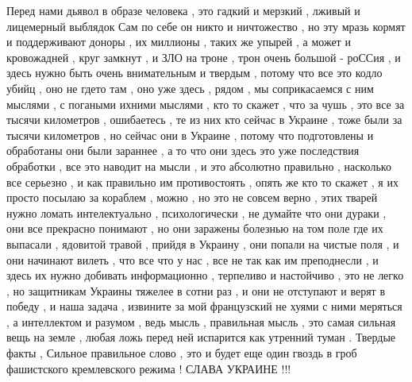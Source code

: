 Перед нами дьявол в образе человека , это гадкий и мерзкий , лживый и
лицемерный выблядок Сам по себе он никто и ничтожество , но эту мразь кормят и
поддерживают доноры , их миллионы , таких же упырей , а может и кровожадней ,
круг замкнут , и ЗЛО на троне , трон очень большой - роССия , и здесь нужно
быть очень внимательным и твердым , потому что все это кодло убийц , оно не
гдето там , оно уже здесь , рядом , мы соприкасаемся с ним мыслями , с погаными
ихними мыслями , кто то скажет , что за чушь , это все за тысячи километров ,
ошибаетесь , те из них кто сейчас в Украине , тоже были за тысячи километров ,
но сейчас они в Украине , потому что подготовлены и обработаны они были
зараннее , а то что они здесь это уже последствия обработки , все это наводит
на мысли , и это абсолютно правильно , насколько все серьезно , и как правильно
им противостоять , опять же кто то скажет , я их просто посылаю за кораблем ,
можно , но это не совсем верно , этих тварей нужно ломать интелектуально ,
психологически , не думайте что они дураки , они все прекрасно понимают , но
они заражены болезнью на том поле где их выпасали , ядовитой травой , прийдя в
Украину , они попали на чистые поля , и они начинают вилеть , что все что у нас
, все не так как им преподнесли , и здесь их нужно добивать информационно ,
терпеливо и настойчиво , это не легко , но защитникам Украины тяжелее в сотни
раз , и они не отступают и верят в победу , и наша задача , извините за мой
французский не хуями с ними меряться , а интеллектом и разумом , ведь мысль ,
правильная мысль , это самая сильная вещь на земле , любая ложь перед ней
испарится как утренний туман . Твердые факты , Сильное правильное слово , это и
будет еще один гвоздь в гроб фашистского кремлевского режима ! СЛАВА УКРАИНЕ
!!!
